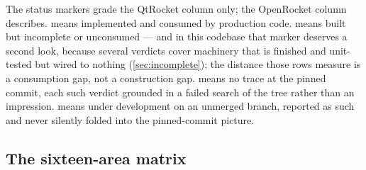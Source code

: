 The status markers grade the QtRocket column only; the OpenRocket column describes.
\fpresent{} means implemented and consumed by production code. \fpartial{} means built but
incomplete or unconsumed --- and in this codebase that marker deserves a second look, because
several \fpartial{} verdicts cover machinery that is finished and unit-tested but wired to
nothing (\cref{sec:incomplete}); the distance those rows measure is a consumption gap, not a
construction gap. \fabsent{} means no trace at the pinned commit, each such verdict grounded in
a failed search of the tree rather than an impression. \fwip{} means under development on an
unmerged branch, reported as such and never silently folded into the pinned-commit picture.

\subsection{The sixteen-area matrix}\label{app:or-features-matrix}

